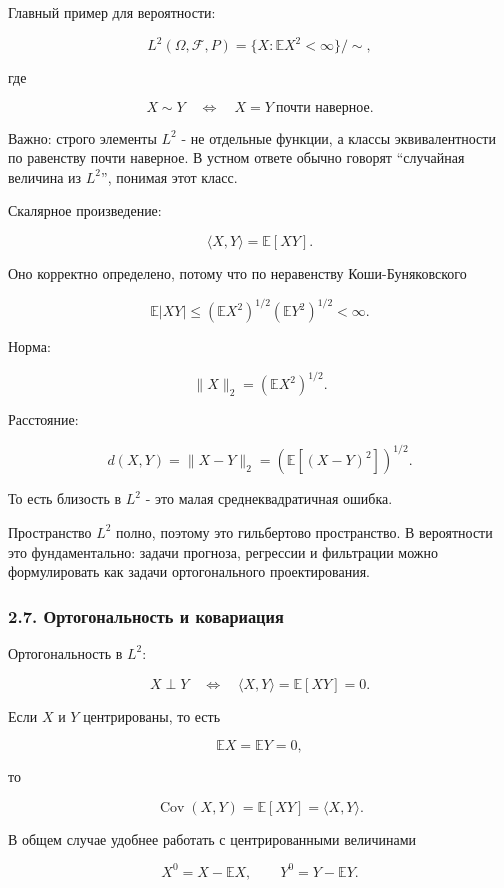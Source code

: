 \documentclass[
  11pt,
  a4paper,
]{article}
\begin{document}
Главный пример для вероятности:

\[
L^2(\Omega,\mathcal F,P)
=
\{X:\mathbb E X^2<\infty\}/\sim,
\]

где

\[
X\sim Y
\quad\Longleftrightarrow\quad
X=Y\ \text{почти наверное}.
\]

Важно: строго элементы \(L^2\) - не отдельные функции, а классы
эквивалентности по равенству почти наверное. В устном ответе обычно
говорят ``случайная величина из \(L^2\)'', понимая этот класс.

Скалярное произведение:

\[
\langle X,Y\rangle=\mathbb E[XY].
\]

Оно корректно определено, потому что по неравенству Коши-Буняковского

\[
\mathbb E|XY|
\le
(\mathbb EX^2)^{1/2}(\mathbb EY^2)^{1/2}<\infty.
\]

Норма:

\[
\|X\|_2=(\mathbb EX^2)^{1/2}.
\]

Расстояние:

\[
d(X,Y)=\|X-Y\|_2
=
\left(\mathbb E[(X-Y)^2]\right)^{1/2}.
\]

То есть близость в \(L^2\) - это малая среднеквадратичная ошибка.

Пространство \(L^2\) полно, поэтому это гильбертово пространство. В
вероятности это фундаментально: задачи прогноза, регрессии и фильтрации
можно формулировать как задачи ортогонального проектирования.

\subsubsection{2.7. Ортогональность и
ковариация}\label{ux43eux440ux442ux43eux433ux43eux43dux430ux43bux44cux43dux43eux441ux442ux44c-ux438-ux43aux43eux432ux430ux440ux438ux430ux446ux438ux44f}

Ортогональность в \(L^2\):

\[
X\perp Y
\quad\Longleftrightarrow\quad
\langle X,Y\rangle=\mathbb E[XY]=0.
\]

Если \(X\) и \(Y\) центрированы, то есть

\[
\mathbb EX=\mathbb EY=0,
\]

то

\[
\operatorname{Cov}(X,Y)=\mathbb E[XY]=\langle X,Y\rangle.
\]

В общем случае удобнее работать с центрированными величинами

\[
X^0=X-\mathbb EX,
\qquad
Y^0=Y-\mathbb EY.
\]
\end{document}
